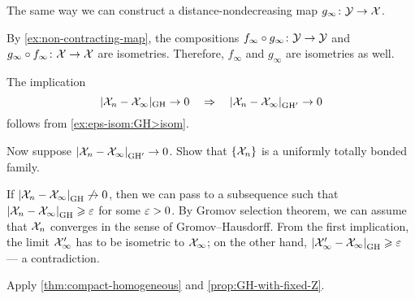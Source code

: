 The same way we can construct a distance-nondecreasing map 
$g_\infty\colon\mathcal{Y}\to \mathcal{X}$.

By \ref{ex:non-contracting-map}, the compositions $f_\infty\circ g_\infty\colon\mathcal{Y}\to \mathcal{Y}$ and $g_\infty\z\circ f_\infty\:\spc{X}\to \spc{X}$ are isometries.
Therefore, $f_\infty$ and $g_\infty$ are isometries as well.

 The implication 
\[|\spc{X}_n-\spc{X}_\infty|_{\GH}\to 0 
\quad\Rightarrow\quad 
\dist{\spc{X}_n}{\spc{X}_\infty}{\GH'}\to 0\]
follows from \ref{ex:eps-isom:GH>isom}. 

Now suppose $\dist{\spc{X}_n}{\spc{X}_\infty}{\GH'}\to 0$.
Show that $\{\mathcal{X}_n\}$ is a uniformly totally bonded family.

If $\dist{\spc{X}_n}{\spc{X}_\infty}{\GH}\not\to 0$, then we can pass to a subsequence such that $\dist{\spc{X}_n}{\spc{X}_\infty}{\GH}\ge\eps$ for some $\varepsilon>0$.
By Gromov selection theorem, we can assume that $\mathcal{X}_n$ converges in the sense of Gromov--Hausdorff.
From the first implication, the limit $\mathcal{X}_\infty'$ has to be isometric to $\mathcal{X}_\infty$;
on the other hand, $\dist{\spc{X}_\infty'}{\spc{X}_\infty}{\GH}\ge \eps$ --- a contradiction.

Apply \ref{thm:compact-homogeneous} and \ref{prop:GH-with-fixed-Z}.

